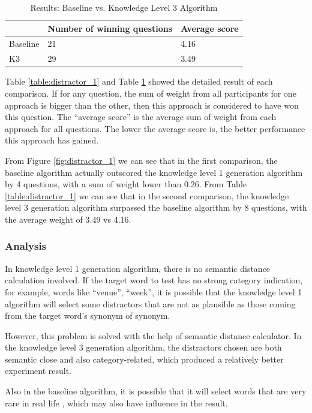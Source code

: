\begin{table}[ht]
    \caption{Results: Baseline vs. Knowledge Level 3 Algorithm}
    \label{table:distractor_2}
    \begin{center}
    \begin{tabular}{| p{1.5cm} | p{2.5cm} | p{2.2cm} |}
        \hline
         & Number of winning questions & Average score\\
        \hline
        Baseline & 21 & 4.16\\
        \hline
        K3 & 29 & 3.49\\
        \hline
    \end{tabular}
    \end{center}
\end{table}

Table \ref{table:distractor_1} and Table \ref{table:distractor_2} showed the detailed result of each comparison. If for any question, the sum of weight from all participants for one approach is bigger than the other, then this approach is considered to have won this question. The “average score” is the average sum of weight from each approach for all questions. The lower the average score is, the better performance this approach has gained.

From Figure \ref{fig:distractor_1} we can see that in the first comparison, the baseline algorithm actually outscored the knowledge level 1 generation algorithm by 4 questions, with a sum of weight lower than 0.26. From Table \ref{table:distractor_1} we can see that in the second comparison, the knowledge level 3 generation algorithm surpassed the baseline algorithm by 8 questions, with the average weight of 3.49 vs 4.16. 

\subsubsection{Analysis}
In knowledge level 1 generation algorithm, there is no semantic distance calculation involved. If the target word to test has no strong category indication, for example, words like “venue”, “week”, it is possible that the knowledge level 1 algorithm will select some distractors that are not as plausible as those coming from the target word’s synonym of synonym. 

However, this problem is solved with the help of semantic distance calculator. In the knowledge level 3 generation algorithm, the distractors chosen are both semantic close and also category-related, which produced a relatively better experiment result.

Also in the baseline algorithm, it is possible that it will select words that are very rare in real life \cite{sus13}, which may also have influence in the result.
